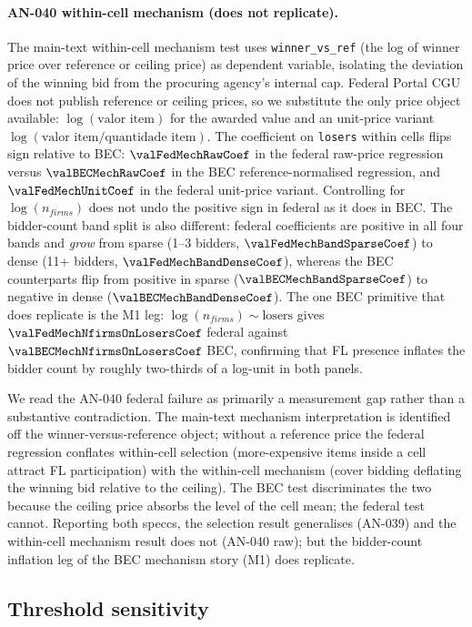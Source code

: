 \paragraph{AN-040 \textemdash{} within-cell mechanism (does not
replicate).}
The main-text within-cell mechanism test uses
\texttt{winner\_vs\_ref} (the log of winner price over reference
or ceiling price) as dependent variable, isolating the
deviation of the winning bid from the procuring agency's
internal cap. Federal Portal CGU does not publish reference or
ceiling prices, so we substitute the only price object available:
$\log(\text{valor item})$ for the awarded value and an unit-price
variant $\log(\text{valor item}/\text{quantidade item})$. The
coefficient on \texttt{losers} within cells flips sign relative
to BEC: $\valFedMechRawCoef$ in the federal raw-price regression
versus $\valBECMechRawCoef$ in the BEC reference-normalised
regression, and $\valFedMechUnitCoef$ in the federal unit-price
variant. Controlling for $\log(n_{firms})$ does not undo the
positive sign in federal as it does in BEC. The bidder-count
band split is also different: federal coefficients are
positive in all four bands and \emph{grow} from sparse
(1--3 bidders, $\valFedMechBandSparseCoef$) to dense
(11+ bidders, $\valFedMechBandDenseCoef$), whereas the BEC
counterparts flip from positive in sparse
($\valBECMechBandSparseCoef$) to negative in dense
($\valBECMechBandDenseCoef$). The one BEC primitive that does
replicate is the M1 leg: $\log(n_{firms}) \sim \text{losers}$
gives $\valFedMechNfirmsOnLosersCoef$ federal against
$\valBECMechNfirmsOnLosersCoef$ BEC, confirming that FL
presence inflates the bidder count by roughly two-thirds of a
log-unit in both panels.

We read the AN-040 federal failure as primarily a measurement
gap rather than a substantive contradiction. The main-text
mechanism interpretation is identified off the
winner-versus-reference object; without a reference price the
federal regression conflates within-cell selection
(more-expensive items inside a cell attract FL participation)
with the within-cell mechanism (cover bidding deflating the
winning bid relative to the ceiling). The BEC test discriminates
the two because the ceiling price absorbs the level of the cell
mean; the federal test cannot. Reporting both speccs, the
selection result generalises (AN-039) and the within-cell
mechanism result does not (AN-040 raw); but the bidder-count
inflation leg of the BEC mechanism story (M1) does replicate.

\subsection{Threshold sensitivity}
\label{app:comprasnet_threshold}

